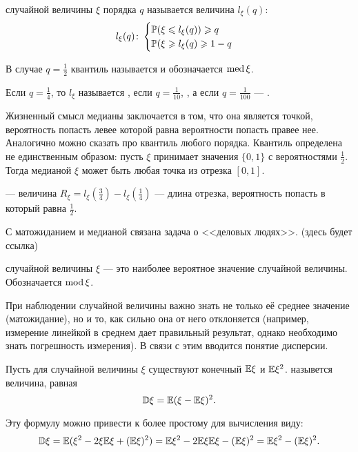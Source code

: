 \documentclass[../TV&MS.tex]{subfiles}
\begin{document}
\begin{Def}
	 случайной величины $\xi$ порядка $q$ называется величина $l_\xi(q)$:
\[
   	l_\xi(q) \colon 
  	\begin{cases}
  		\mathbb{P}(\xi \leqslant l_\xi(q)) \geqslant q \\
  		\mathbb{P}(\xi \geqslant l_\xi(q) \geqslant 1-q
  	\end{cases}
  \]
  
  В случае $q=\frac12$ квантиль называется  и обозначается ${\rm med \,}\xi$.
  
  Если $q=\frac14$, то $l_\xi$ называется , если $q=\frac1{10}$, 
  , а если $q=\frac{1}{100}$ --- .
\end{Def}

Жизненный смысл медианы заключается в том, что она является точкой, вероятность 
попасть левее которой равна вероятности попасть правее нее. Аналогично можно 
сказать про квантиль любого порядка. Квантиль определена не единственным образом: 
пусть $\xi$ принимает значения $\{0, 1\}$ с вероятностями $\frac12$. Тогда медианой
$\xi$ может быть любая точка из отрезка $[0,1]$.

\begin{Def}
 --- величина $R_\xi = l_\xi(\frac34) - l_\xi(\frac14)$ 
--- длина отрезка, вероятность попасть в который равна $\frac12$. 
\end{Def}

С матожиданием и медианой связана задача о <<деловых людях>>. (здесь будет ссылка) 

\begin{Def}
 случайной величины $\xi$ --- это наиболее вероятное значение случайной 
величины. Обозначается ${\rm mod \,}\xi$.
\end{Def}

При наблюдении случайной величины важно знать не только её среднее значение (матожидание), 
но и то, как сильно она от него отклоняется (например, измерение линейкой в среднем дает 
правильный результат, однако необходимо знать погрешность измерения). В связи с этим 
вводится понятие дисперсии.

\begin{Def}
	Пусть для случайной величины $\xi$ существуют конечный $\mathbb{E}\xi$ и $\mathbb{E}\xi^2$.  
	 назывется величина, равная 
	$$ \mathbb{D}\xi = \mathbb{E}(\xi - \mathbb{E}\xi)^2.$$
\end{Def}

	Эту формулу можно привести к более простому для вычисления виду:
$$\mathbb{D}\xi = \mathbb{E}(\xi^2 - 2\xi\mathbb{E}\xi + (\mathbb{E}\xi)^2) = \mathbb{E}\xi^2 - 
2\mathbb{E}\xi\mathbb{E}\xi - (\mathbb{E}\xi)^2 = \mathbb{E}\xi^2 - (\mathbb{E}\xi)^2.$$
\end{document}

